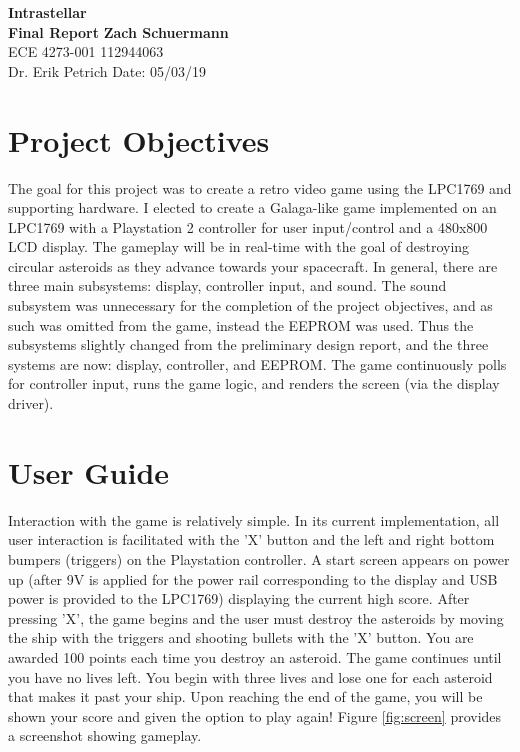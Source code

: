 \documentclass[a4paper, 12pt]{article}
\begin{document}
\noindent
\LARGE\textbf{Intrastellar} \hfill \\
\newline
\large\textbf{Final Report} \hfill \textbf{Zach Schuermann} \\
\normalsize ECE 4273-001 \hfill 112944063 \\
Dr. Erik Petrich \hfill Date: 05/03/19 

\section*{Project Objectives}
The goal for this project was to create a retro video game using the LPC1769 and supporting hardware. I elected to create a Galaga-like game implemented on an LPC1769 with a Playstation 2 controller for user input/control and a 480x800 LCD display. The gameplay will be in real-time with the goal of destroying circular asteroids as they advance towards your spacecraft. In general, there are three main subsystems: display, controller input, and sound. The sound subsystem was unnecessary for the completion of the project objectives, and as such was omitted from the game, instead the EEPROM was used. Thus the subsystems slightly changed from the preliminary design report, and the three systems are now: display, controller, and EEPROM. The game continuously polls for controller input, runs the game logic, and renders the screen (via the display driver). 

\section*{User Guide}
Interaction with the game is relatively simple. In its current implementation, all user interaction is facilitated with the 'X' button and the left and right bottom bumpers (triggers) on the Playstation controller. A start screen appears on power up (after 9V is applied for the power rail corresponding to the display and USB power is provided to the LPC1769) displaying the current high score. After pressing 'X', the game begins and the user must destroy the asteroids by moving the ship with the triggers and shooting bullets with the 'X' button. You are awarded 100 points each time you destroy an asteroid. The game continues until you have no lives left. You begin with three lives and lose one for each asteroid that makes it past your ship. Upon reaching the end of the game, you will be shown your score and given the option to play again! Figure \ref{fig:screen} provides a screenshot showing gameplay.
\end{document}
